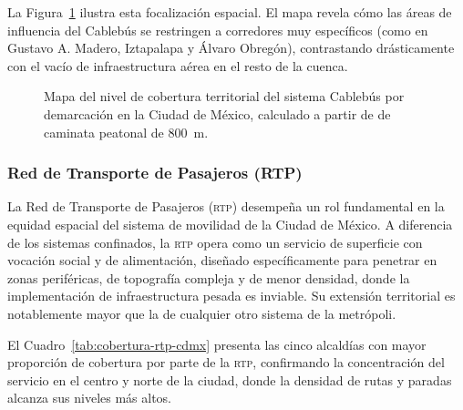 La Figura~\ref{fig:mapa-cobertura-cbb} ilustra esta focalización espacial. El mapa
revela cómo las áreas de influencia del Cablebús se restringen a corredores muy
específicos (como en Gustavo A. Madero, Iztapalapa y Álvaro Obregón), contrastando
drásticamente con el vacío de infraestructura aérea en el resto de la cuenca.

\begin{figure}[H]
    \centering
    \caption[Mapa de cobertura territorial del Cablebús en la CDMX]{Mapa del
    nivel de cobertura territorial del sistema Cablebús por demarcación en la
    Ciudad de México, calculado a partir de  de caminata
    peatonal de 800~m.}
    \label{fig:mapa-cobertura-cbb}
\end{figure}

\subsubsection{Red de Transporte de Pasajeros (RTP)}
\label{subsubsec:cobertura-rtp}

La Red de Transporte de Pasajeros (\textsc{rtp}) desempeña un rol fundamental en
la equidad espacial del sistema de movilidad de la Ciudad de México. A diferencia
de los sistemas confinados, la \textsc{rtp} opera como un servicio de superficie
con vocación social y de alimentación, diseñado específicamente para penetrar en
zonas periféricas, de topografía compleja y de menor densidad, donde la
implementación de infraestructura pesada es inviable. Su extensión territorial es
notablemente mayor que la de cualquier otro sistema de la metrópoli.

El Cuadro~\ref{tab:cobertura-rtp-cdmx} presenta las cinco alcaldías con mayor
proporción de cobertura por parte de la \textsc{rtp}, confirmando la concentración
del servicio en el centro y norte de la ciudad, donde la densidad de rutas y paradas
alcanza sus niveles más altos.

